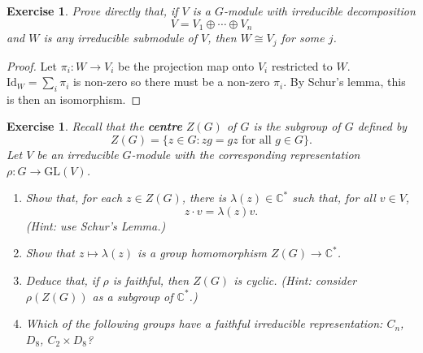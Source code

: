 \documentclass{article}
\newtheorem{exercise}[theorem]{Exercise}
\begin{document}
\begin{exercise}
     Prove directly that, if \( V \) is a \( G \)-module with irreducible decomposition 
    \[
    V = V_1 \oplus \cdots \oplus V_n
    \]
    and \( W \) is any irreducible submodule of \( V \), then \( W \cong V_j \) for some \( j \).
\end{exercise}
\begin{proof}
Let $\pi_i:W\to V_i$ be the projection map onto $V_i$ restricted to $W$. $\text{Id}_W=\sum_i\pi_i$ is non-zero so there must be a non-zero $\pi_i$. By Schur's lemma, this is then an isomorphism.
\end{proof}

\begin{exercise}
     Recall that the \textbf{centre} \( Z(G) \) of \( G \) is the subgroup of \( G \) defined by
    \[
    Z(G) = \{ z \in G : zg = gz \text{ for all } g \in G \}.
    \]
    Let \( V \) be an irreducible \( G \)-module with the corresponding representation \( \rho : G \to \mathrm{GL}(V) \).

    \begin{enumerate}
        \item[(a)] Show that, for each \( z \in Z(G) \), there is \( \lambda(z) \in \mathbb{C}^* \) such that, for all \( v \in V \),
        \[
        z\cdot v = \lambda(z)v.
        \]
        (Hint: use Schur's Lemma.)

        \item[(b)] Show that \( z \mapsto \lambda(z) \) is a group homomorphism \( Z(G) \to \mathbb{C}^* \).

        \item[(c)] Deduce that, if \( \rho \) is faithful, then \( Z(G) \) is cyclic. (Hint: consider \( \rho(Z(G)) \) as a subgroup of \( \mathbb{C}^* \).)

        \item[(d)] Which of the following groups have a faithful irreducible representation: \( C_n \), \( D_8 \), \( C_2 \times D_8 \)?
    \end{enumerate}
\end{exercise}
\end{document}

